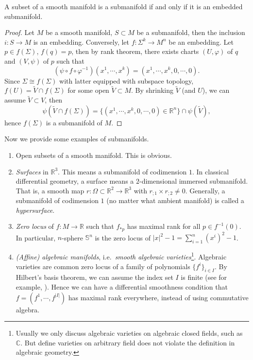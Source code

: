 \begin{prop}\label{submanifold embedded}
    A subset of a smooth manifold is a submanifold if and only if it is an embedded submanifold.
\end{prop}
\begin{proof}
    Let $M$ be a smooth manifold, $S\subset M$ be a submanifold, then the inclusion $i:S\to M$ is an embedding.
    Conversely, let $f:\Sigma^k\to M^n$ be an embedding.
    Let $p\in f(\Sigma)$, $f(q)=p$, then by rank theorem, there exists charts $(U,\varphi)$ of $q$ and $(V,\psi)$ of $p$ such that
    \[(\psi\circ f\circ\varphi^{-1})(x^1,\cdots,x^k)=(x^1,\cdots,x^k,0,\cdots,0).\]
    Since $\Sigma\cong f(\Sigma)$ with latter equipped with subspace topology, $f(U)=\tilde{V}\cap f(\Sigma)$ for some open $\tilde{V}\subset M$.
    By shrinking $\tilde{V}$ (and $U$), we can assume $\tilde{V}\subset V$, then
    \[\psi(\tilde{V}\cap f(\Sigma))=\{(x^1,\cdots,x^k,0,\cdots,0)\in\mathbb{R}^n\}\cap\psi(\tilde{V}),\]
    hence $f(\Sigma)$ is a submanifold of $M$.
\end{proof}

Now we provide some examples of submanifolds.
\begin{eg}
    \begin{enumerate}[(1)]
        \item Open subsets of a smooth manifold.
        This is obvious.
        \item \emph{Surfaces} in $\mathbb{R}^3$.
        This means a submanifold of codimension $1$.
        In classical differential geometry, a surface means a $2$-dimensional immersed submanifold.
        That is, a smooth map $r:\Omega\subset\mathbb{R}^2\to\mathbb{R}^3$ with $r_{;1}\times r_{;2}\neq 0$.
        Generally, a submanifold of codimension $1$ (no matter what ambient manifold) is called a \emph{hypersurface}.
        \item \emph{Zero locus} of $f:M\to\mathbb{R}$ such that $f_{*p}$ has maximal rank for all $p\in f^{-1}(0)$.
        In particular, $n$-sphere $\mathbb{S}^n$ is the zero locus of $|x|^2-1=\sum_{i=1}^n(x^i)^2-1$.
        \item \emph{(Affine) algebraic manifolds}, i.e.\ \emph{smooth algebraic varieties}\footnote{Usually we only discuss algebraic varieties on algebraic closed fields, such as $\mathbb{C}$. But define varieties on arbitrary field does not violate the definition in algebraic geometry.}.
        Algebraic varieties are common zero locus of a family of polynomials $\{f^i\}_{i\in I}$.
        By Hilbert's basis theorem, we can assume the index set $I$ is finite (see for example, \cite[Theorem~B-1.16]{Rotman}).
        Hence we can have a differential smoothness condition that $f=(f^1,\cdots,f^{|I|})$ has maximal rank everywhere, instead of using commutative algebra.
    \end{enumerate}
\end{eg}

